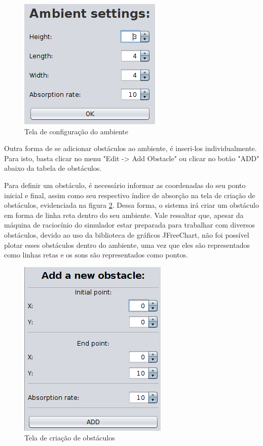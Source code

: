 \begin{figure}[!htb]
\centering
\includegraphics[scale=0.6]{figuras/telas/ambient_settings}
\caption{Tela de configuração do ambiente}
\label{ambient_settings}
\end{figure}

Outra forma de se adicionar obstáculos ao ambiente, é inseri-los individualmente. Para isto, basta clicar no menu "Edit -> Add Obstacle" ou clicar no botão "ADD" abaixo da tabela de obstáculos.

Para definir um obstáculo, é necessário informar as coordenadas do seu ponto inicial e final, assim como seu respectivo índice de absorção na tela de criação de obstáculos, evidenciada na figura \ref{add_obstacle}. Dessa forma, o sistema irá criar um obstáculo em forma de linha reta dentro do seu ambiente. Vale ressaltar que, apesar da máquina de raciocínio do simulador estar preparada para trabalhar com diversos obstáculos, devido ao uso da biblioteca de gráficos JFreeChart, não foi possível plotar esses obstáculos dentro do ambiente, uma vez que eles são representados como linhas retas e os sons são representados como pontos.

\begin{figure}[!htb]
\centering
\includegraphics[scale=0.6]{figuras/telas/add_obstacle}
\caption{Tela de criação de obstáculos}
\label{add_obstacle}
\end{figure}

